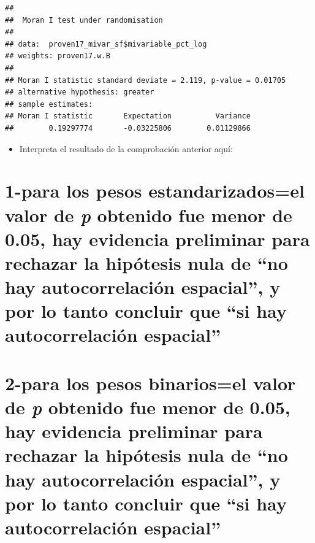 \documentclass[11pt,]{article}
\newenvironment{Shaded}{\begin{snugshade}}{\end{snugshade}}
\newcommand{\KeywordTok}[1]{\textcolor[rgb]{0.13,0.29,0.53}{\textbf{#1}}}
\newcommand{\DataTypeTok}[1]{\textcolor[rgb]{0.13,0.29,0.53}{#1}}
\newcommand{\StringTok}[1]{\textcolor[rgb]{0.31,0.60,0.02}{#1}}
\newcommand{\OperatorTok}[1]{\textcolor[rgb]{0.81,0.36,0.00}{\textbf{#1}}}
\newcommand{\NormalTok}[1]{#1}
\providecommand{\tightlist}{%
\setlength{\itemsep}{0pt}\setlength{\parskip}{0pt}}
\begin{document}
\begin{Shaded}
\end{Shaded}

\begin{verbatim}
## 
##  Moran I test under randomisation
## 
## data:  proven17_mivar_sf$mivariable_pct_log  
## weights: proven17.w.B    
## 
## Moran I statistic standard deviate = 2.119, p-value = 0.01705
## alternative hypothesis: greater
## sample estimates:
## Moran I statistic       Expectation          Variance 
##        0.19297774       -0.03225806        0.01129866
\end{verbatim}

\begin{itemize}
\tightlist
\item
  Interpreta el resultado de la comprobación anterior aquí:
\end{itemize}

\section{\texorpdfstring{1-para los pesos estandarizados=el valor de
\emph{p} obtenido fue menor de 0.05, hay evidencia preliminar para
rechazar la hipótesis nula de ``no hay autocorrelación espacial'', y por
lo tanto concluir que ``si hay autocorrelación
espacial''}{1-para los pesos estandarizados=el valor de p obtenido fue menor de 0.05, hay evidencia preliminar para rechazar la hipótesis nula de no hay autocorrelación espacial, y por lo tanto concluir que si hay autocorrelación espacial}}\label{para-los-pesos-estandarizadosel-valor-de-p-obtenido-fue-menor-de-0.05-hay-evidencia-preliminar-para-rechazar-la-hipuxf3tesis-nula-de-no-hay-autocorrelaciuxf3n-espacial-y-por-lo-tanto-concluir-que-si-hay-autocorrelaciuxf3n-espacial}

\section{\texorpdfstring{2-para los pesos binarios=el valor de \emph{p}
obtenido fue menor de 0.05, hay evidencia preliminar para rechazar la
hipótesis nula de ``no hay autocorrelación espacial'', y por lo tanto
concluir que ``si hay autocorrelación
espacial''}{2-para los pesos binarios=el valor de p obtenido fue menor de 0.05, hay evidencia preliminar para rechazar la hipótesis nula de no hay autocorrelación espacial, y por lo tanto concluir que si hay autocorrelación espacial}}\label{para-los-pesos-binariosel-valor-de-p-obtenido-fue-menor-de-0.05-hay-evidencia-preliminar-para-rechazar-la-hipuxf3tesis-nula-de-no-hay-autocorrelaciuxf3n-espacial-y-por-lo-tanto-concluir-que-si-hay-autocorrelaciuxf3n-espacial}
\end{document}
